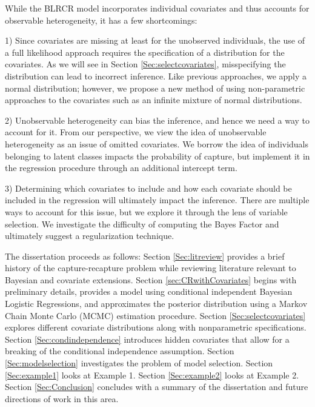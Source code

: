 \documentclass[
  12pt,
]{article}
\begin{document}
While the BLRCR model incorporates individual covariates and thus
accounts for observable heterogeneity, it has a few shortcomings:

\begin{list}{}{}
\item[1)] Since covariates are missing at least for the unobserved individuals, the use of a full likelihood approach requires the specification of a distribution for the covariates. As we will see in Section \ref{Sec:selectcovariates}, misspecifying the distribution can lead to incorrect inference. Like previous approaches, we apply a normal distribution; however, we propose a new method of using non-parametric approaches to the covariates such as an infinite mixture of normal distributions.

\item[2)] Unobservable heterogeneity can bias the inference, and hence we need a way to account for it. From our perspective, we view the idea of unobservable heterogeneity as an issue of omitted covariates. We borrow the idea of individuals belonging to latent classes impacts the probability of capture\citep{manriquevallier_bayesian_2016}, but implement it in the regression procedure through an additional intercept term. 

\item[3)] Determining which covariates to include and how each covariate should be included in the regression will ultimately impact the inference. There are multiple ways to account for this issue, but we explore it through the lens of variable selection. We investigate the difficulty of computing the Bayes Factor and ultimately suggest a regularization technique.

\end{list}

The dissertation proceeds as follows: Section \ref{Sec:litreview}
provides a brief history of the capture-recapture problem while
reviewing literature relevant to Bayesian and covariate extensions.
Section \ref{sec:CRwithCovariates} begins with preliminary details,
provides a model using conditional independent Bayesian Logistic
Regressions, and approximates the posterior distribution using a Markov
Chain Monte Carlo (MCMC) estimation procedure. Section
\ref{Sec:selectcovariates} explores different covariate distributions
along with nonparametric specifications. Section
\ref{Sec:condindependence} introduces hidden covariates that allow for a
breaking of the conditional independence assumption. Section
\ref{Sec:modelselection} investigates the problem of model selection.
Section \ref{Sec:example1} looks at Example 1. Section
\ref{Sec:example2} looks at Example 2. Section \ref{Sec:Conclusion}
concludes with a summary of the dissertation and future directions of
work in this area.
\end{document}
